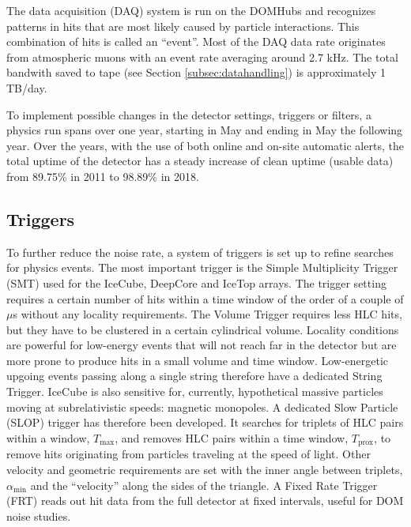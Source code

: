 The data acquisition (DAQ) system is run on the DOMHubs and recognizes patterns in hits that are most likely caused by particle interactions. This combination of hits is called an ``event''. Most of the DAQ data rate originates from atmospheric muons with an event rate averaging around 2.7 kHz. The total bandwith saved to tape (see Section \ref{subsec:datahandling}) is approximately 1 TB/day.

To implement possible changes in the detector settings, triggers or filters, a physics run spans over one year, starting in May and ending in May the following year. Over the years, with the use of both online and on-site automatic alerts, the total uptime of the detector has a steady increase of clean uptime (usable data) from 89.75\% in 2011 to 98.89\% in 2018.

\subsection{Triggers}
\label{subsec:triggers}
To further reduce the noise rate, a system of triggers is set up to refine searches for physics events. The most important trigger is the Simple Multiplicity Trigger (SMT) used for the IceCube, DeepCore and IceTop arrays. The trigger setting requires a certain number of hits within a time window of the order of a couple of $\mu$s without any locality requirements. The Volume Trigger requires less HLC hits, but they have to be clustered in a certain cylindrical volume. Locality conditions are powerful for low-energy events that will not reach far in the detector but are more prone to produce hits in a small volume and time window. Low-energetic upgoing events passing along a single string therefore have a dedicated String Trigger. IceCube is also sensitive for, currently, hypothetical massive particles moving at subrelativistic speeds: magnetic monopoles. A dedicated Slow Particle (SLOP) trigger has therefore been developed. It searches for triplets of HLC pairs within a window, $T_{\textrm{max}}$, and removes HLC pairs within a time window, $T_{\textrm{prox}}$, to remove hits originating from particles traveling at the speed of light. Other velocity and geometric requirements are set with the inner angle between triplets, $\alpha_{\textrm{min}}$ and the ``velocity'' along the sides of the triangle. A Fixed Rate Trigger (FRT) reads out hit data from the full detector at fixed intervals, useful for DOM noise studies.

